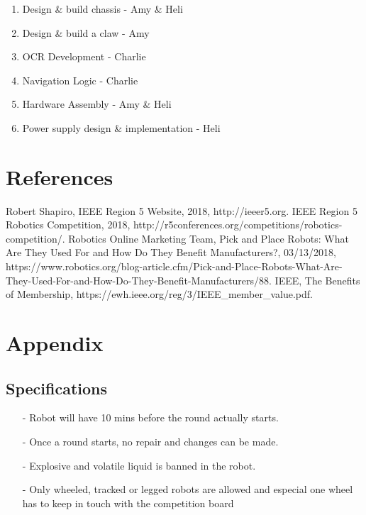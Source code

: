 \documentclass[12pt]{article}
\begin{document}
\begin{enumerate}[noitemsep]
	\item Design \& build chassis -  Amy \& Heli
	\item Design \& build a claw - Amy
	\item OCR Development - Charlie
	\item Navigation Logic - Charlie
	\item Hardware Assembly - Amy \& Heli
	\item Power supply design \& implementation - Heli
\end{enumerate}

\section{References}
\begin{thebibliography}{4}
	Robert Shapiro, IEEE Region 5 Website, 2018, http://ieeer5.org.
	IEEE Region 5 Robotics Competition, 2018, http://r5conferences.org/competitions/robotics-competition/.
	Robotics Online Marketing Team, Pick and Place Robots: What Are They Used For and How Do They Benefit Manufacturers?, 03/13/2018, https://www.robotics.org/blog-article.cfm/Pick-and-Place-Robots-What-Are-They-Used-For-and-How-Do-They-Benefit-Manufacturers/88.
	IEEE, The Benefits of Membership, https://ewh.ieee.org/reg/3/IEEE\_member\_value.pdf.
	
\end{thebibliography}

\section{Appendix}

\subsection{Specifications}

\begin{itemize}[noitemsep]
	\item[-] Robot will have 10 mins before the round actually starts.
	\item[-] Once a round starts, no repair and changes can be made. 
	\item[-] Explosive and volatile liquid is banned in the robot.
	\item[-] Only wheeled, tracked or legged robots are allowed and especial one wheel has to keep in touch with the competition board
\end{itemize}
\end{document}
